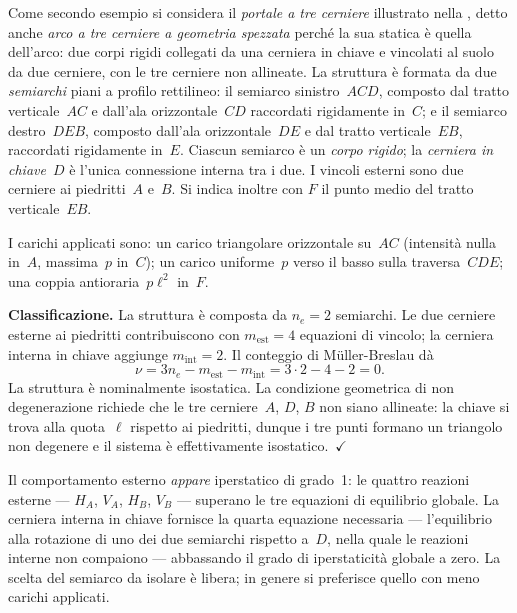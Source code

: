 Come secondo esempio si considera il \emph{portale a tre
	cerniere} illustrato nella
, detto anche \emph{arco a tre
	cerniere a geometria spezzata}
perché la sua statica è quella dell'arco: due corpi rigidi
collegati da una cerniera in chiave e vincolati al suolo da
due cerniere, con le tre cerniere non allineate.
La struttura è formata da due \emph{semiarchi} piani a profilo
rettilineo: il semiarco sinistro~$ACD$, composto dal tratto
verticale~$AC$ e dall'ala orizzontale~$CD$ raccordati
rigidamente in~$C$; e il semiarco destro~$DEB$, composto
dall'ala orizzontale~$DE$ e dal tratto verticale~$EB$,
raccordati rigidamente in~$E$.
Ciascun semiarco è un \emph{corpo rigido}; la
\emph{cerniera in chiave}~$D$ è l'unica connessione interna
tra i due. I vincoli esterni sono due cerniere ai
piedritti~$A$ e~$B$.
Si indica inoltre con $F$ il punto medio del tratto verticale~$EB$.

I carichi applicati sono: un carico triangolare orizzontale
su~$AC$ (intensità nulla in~$A$, massima~$p$ in~$C$);
un carico uniforme~$p$ verso il basso sulla traversa~$CDE$;
una coppia antioraria~$p\ell^2$ in~$F$.






\noindent\textbf{Classificazione.}
La struttura è composta da $n_e = 2$ semiarchi.
Le due cerniere esterne ai piedritti contribuiscono con
$m_{\mathrm{est}} = 4$ equazioni di vincolo;
la cerniera interna in chiave aggiunge
$m_{\mathrm{int}} = 2$.
Il conteggio di Müller-Breslau dà
\[
\nu
= 3n_e - m_{\mathrm{est}} - m_{\mathrm{int}}
= 3 \cdot 2 - 4 - 2
= 0.
\]
La struttura è nominalmente isostatica.
La condizione geometrica di non degenerazione
richiede che le tre cerniere~$A$, $D$, $B$ non siano
allineate: la chiave si trova alla quota~$\ell$ rispetto
ai piedritti, dunque i tre punti formano un triangolo
non degenere e il sistema è effettivamente
isostatico.~$\checkmark$

\begin{oss}
	Il comportamento esterno \emph{appare} iperstatico
	di grado~1: le quattro reazioni esterne --- $H_A$,
	$V_A$, $H_B$, $V_B$ --- superano le tre equazioni
	di equilibrio globale. La cerniera interna in chiave
	fornisce la quarta equazione necessaria ---
	l'equilibrio alla rotazione di uno dei due semiarchi
	rispetto a~$D$, nella quale le reazioni interne
	non compaiono --- abbassando il grado di
	iperstaticità globale a zero. La scelta del semiarco
	da isolare è libera; in genere si preferisce quello
	con meno carichi applicati.
\end{oss}

